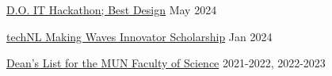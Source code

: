 \href{https://github.com/EthanDenny/do-it-hackathon}{D.O. IT Hackathon; Best Design} \hfill May 2024 \par
\href{https://technl.ca/}{techNL Making Waves Innovator Scholarship} \hfill Jan 2024 \par
\href{https://www.mun.ca/science/undergraduates/scholarships-and-awards/deans-list/}{Dean’s List for the MUN Faculty of Science} \hfill 2021-2022, 2022-2023 \par
